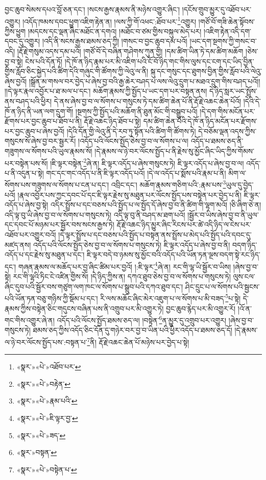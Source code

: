 བྱང་ཆུབ་སེམས་དཔའ་བློ་ཅན་དང་། །སངས་རྒྱས་རྣམས་ནི་མཉེས་འགྱུར་ཞིང་། །དངོས་གྲུབ་མྱུར་དུ་འཐོབ་པར་འགྱུར། །འདོད་ཁམས་དབང་ཕྱུག་འཇིག་རྟེན་ན། །ལས་ཀྱི་གོ་འཕང་:ཐོབ་པར་\footnote{«སྣར་»«པེ་»འཐོབ་པར་}འགྱུར། །གཙོ་བོ་གཟི་ཆེན་སྟོབས་ཀྱིས་ཕྱུག །མདངས་དང་ལྡན་ཞིང་མཐོང་ན་དགའ། །མཐོང་བ་ཙམ་གྱིས་བསྐུལ་མེད་པར། །འཇིག་རྟེན་འདི་དག་དབང་དུ་འགྱུར། །འདི་ནི་སངས་རྒྱས་ཐམས་ཅད་ཀྱི། །གསང་བ་བྱང་ཆུབ་དམ་པའོ། །ཡང་དག་སྔགས་ཀྱི་གསང་བ་འདི། །རྡོ་རྗེ་གསུམ་འདས་དམ་པའོ། །གཙོ་བོ་དེ་བཞིན་གཤེགས་ཀུན་གྱི། །དམ་ཚིག་ཡིན་ཏེ་དམ་ཚིག་མཆོག །ཅེས་བྱ་བ་སྟེ། ངེས་པའི་དོན་ཏོ། །དེ་ཁོ་ན་ཉིད་རྣམ་པར་མི་འཇིག་པའི་ངོ་བོ་ཉིད་གང་གིས་ལུས་དང་ངག་དང་ཡིད་བྱིན་གྱིས་རློབ་ཅིང་སྐྱེད་པའི་ཚིག་དེའི་གཞུང་གི་ཚོགས་ཀྱི་ལེའུ་ལ་ནི། སྐུ་དང་གསུང་དང་ཐུགས་བྱིན་གྱིས་རློབ་པའི་ལེའུ་ཞེས་བྱའོ། །སྒྲོན་མ་གསལ་བར་བྱེད་པ་ཞེས་བྱ་བའི་རྒྱ་ཆེར་བཤད་པ་ལས་ལེའུ་དྲུག་པ་མཐའ་དྲུག་གིས་བཤད་པའོ།། །།དེ་ལྟར་རྣལ་འབྱོར་པ་ཐ་མལ་པ་དང་། མཆོག་རྣམས་ཀྱི་སྤྱོད་པ་ཡང་དག་པར་བསྟན་ནས། དེ་ཉིད་སླར་ཡང་སྤྲོས་ནས་བཤད་པའི་ཕྱིར། དེ་ནས་ཞེས་བྱ་བ་ལ་སོགས་པ་གསུངས་ཏེ་དམ་ཚིག་ཆེན་པོ་ནི་རྡོ་རྗེ་འཆང་ཆེན་པོའོ། །དེའི་དེ་ཁོ་ན་ཉིད་ནི་ཡན་ལག་དྲུག་གོ། །སྔགས་ཀྱི་སྤྱོད་པའི་མཆོག་ནི་ཐུན་མོང་གི་བསྒྲུབ་པའོ། །དེ་དག་གིས་མངོན་པར་རྫོགས་པར་བྱང་ཆུབ་པ་ཐོབ་པ་ནི། རྡོ་རྗེ་འཆང་ཉིད་ཐོབ་པ་སྟེ། དམ་ཚིག་ཆེན་པོའི་དེ་ཁོ་ན་ཉིད་མངོན་པར་རྫོགས་པར་བྱང་ཆུབ་པ་ཞེས་བྱའོ། །དེའི་དོན་གྱི་ལེའུ་ནི་དེ་རབ་ཏུ་སྟོན་པའི་ཚིག་གི་ཚོགས་ཏེ། དེ་བཅོམ་ལྡན་འདས་ཀྱིས་གསུངས་སོ་ཞེས་བྱ་བར་སྦྱར་རོ། །འདོད་པའི་ལོངས་སྤྱོད་ཅེས་བྱ་བ་ལ་སོགས་པ་ལ། འདོད་པ་ཐམས་ཅད་ནི་གཟུགས་ལ་སོགས་པའི་ཡུལ་རྣམས་སོ། །དེ་རྣམས་ལ་ཉེ་བར་ལོངས་སྤྱོད་པ་ནི་རྗེས་སུ་མྱོང་ཞིང་ཡིད་ཀྱིས་གོམས་པར་བསྟེན་པས་སོ། །ཇི་ལྟར་བསྟེན་\footnote{«སྣར་»«པེ་»བརྟེན་}ཞེ་ན། ཇི་ལྟར་འདོད་པ་ཞེས་གསུངས་ཏེ། ཇི་ལྟར་འདོད་པ་ཞེས་བྱ་བ་ལ། འདོད་པ་ནི་འདུན་པ་སྟེ། གང་དང་གང་འདོད་པ་ནི་ཇི་ལྟར་འདོད་པའོ། །དེ་ལ་འདོད་པ་སྨོས་པའི་རྣམ་པ་ནི། མིག་ལ་སོགས་པས་གཟུགས་ལ་སོགས་པ་ངན་པ་དང་། འབྲིང་དང་། མཆོག་རྣམས་གཅིག་པའི་:རྣམ་པས་\footnote{«སྣར་»«པེ་»རྣམ་པའི་}ཡུལ་དུ་བྱེད་པའོ། །རྣལ་འབྱོར་པས་ཀྱང་དབང་པོ་དང་ཇི་ལྟར་རྗེས་སུ་མཐུན་པར་ལོངས་སྤྱོད་པས་བསྟེན་པར་བྱེད་པ་ནི། ཇི་ལྟར་འདོད་པ་ཞེས་བྱ་སྟེ། འདིར་སྤྲོས་པ་དང་བཅས་པའི་སྤྱོད་པ་ལ་སྤྱོད་དོ་ཞེས་བྱ་བ་ནི་ཚིག་གི་ལྷག་མའོ། །ཅི་ཞིག་ཅེ་ན། འདི་ལྟ་བུ་ཡི་ཞེས་བྱ་བ་ལ་སོགས་པ་གསུངས་ཏེ། འདི་ལྟ་བུ་ནི་བཤད་མ་ཐག་པའོ། །སྦྱོར་བ་ཡིས་ཞེས་བྱ་བ་ནི་ཡུལ་དང་དབང་པོ་མཉམ་པར་སྦྱོར་བས་སངས་རྒྱས་ཏེ། རྡོ་རྗེ་འཆང་ཉིད་མྱུར་ཞིང་རིངས་པར་ཚེ་འདི་ཉིད་ལ་ངེས་པར་འཐོབ་པར་འགྱུར་བའོ། །དེ་ལྟར་སྤྲོས་པ་དང་བཅས་པའི་སྤྱོད་པ་བསྟན་ནས་སྤྲོས་པ་མེད་པའི་སྤྱོད་པའི་དབང་དུ་མཛད་ནས། འདོད་པའི་ལོངས་སྤྱོད་ཅེས་བྱ་བ་ལ་སོགས་པ་གསུངས་ཏེ། ཇི་ལྟར་འདོད་པ་ཞེས་བྱ་བ་ནི། བདག་ཉིད་འདོད་པ་དང་རྗེས་སུ་མཐུན་པ་དང་། ཇི་ལྟར་བདེ་བ་ཉམས་སུ་མྱོང་བའི་འདོད་པའི་ཡོན་ཏན་ལྔས་བདག་སྟེ་རང་ཉིད་དང་། གཞན་རྣམས་ལ་མཆོད་པར་བྱ་ཞིང་ཚིམ་པར་བྱའོ། །:ཇི་ལྟར་\footnote{«སྣར་»«པེ་»ཇི་ལྟར་བྱ་}ཞེ་ན། རང་གི་ལྷ་ཡི་སྦྱོར་བ་ཡིས། །ཞེས་བྱ་བ་སྟེ། རང་གི་ལྷའི་ཏིང་ངེ་འཛིན་གྱིས་སོ། །དེ་ཉིད་ཀྱིས་ན། དཀའ་ཐུབ་ཅེས་བྱ་བ་ལ་སོགས་པ་གསུངས་ཏེ། ལུས་ངལ་ཞིང་དུབ་པའི་སྦྱོར་བས་གཙུག་ལག་ཁང་ལ་སོགས་པ་སྒྲུབ་པའི་དཀའ་ཐུབ་དང་། ཤིང་དྲུང་པ་ལ་སོགས་པའི་སྦྱངས་པའི་ཡོན་ཏན་བཅུ་གཉིས་ཀྱི་སྡོམ་པ་དང་། རི་ལས་མཆོང་ཞིང་མེར་འཇུག་པ་ལ་སོགས་པ་མི་བཟད་\footnote{«སྣར་»«པེ་»ཟད་}པ་སྟེ། དེ་རྣམས་ཀྱིས་བསྟེན་ཅིང་གདུངས་བཞིན་པས་ནི་འགྲུབ་པར་མི་འགྱུར་ཏེ། བྱང་ཆུབ་རྙེད་པར་མི་འགྱུར་རོ། །འོ་ན་གང་གིས་འགྱུར་ཞེ་ན། འདོད་པའི་ལོངས་སྤྱོད་ཐམས་ཅད་ལ། །བསྟེན་\footnote{«སྣར་»བསྟན་}ན་མྱུར་དུ་འགྲུབ་པར་འགྱུར། །ཞེས་བྱ་བ་གསུངས་ཏེ། ཐམས་ཅད་ཀྱིས་འདོད་ཅིང་དོན་དུ་གཉེར་བར་བྱ་བ་ཡིན་པའི་ཕྱིར་འདོད་པ་ཐམས་ཅད་དོ། །དེ་རྣམས་ལ་ཉེ་བར་ལོངས་སྤྱོད་པས་:བསྟན་པ་\footnote{«སྣར་»«པེ་»བསྟེན་པ་}ནི། རྡོ་རྗེ་འཆང་ཆེན་པོ་མཉེས་པར་བྱེད་པ་སྟེ། 